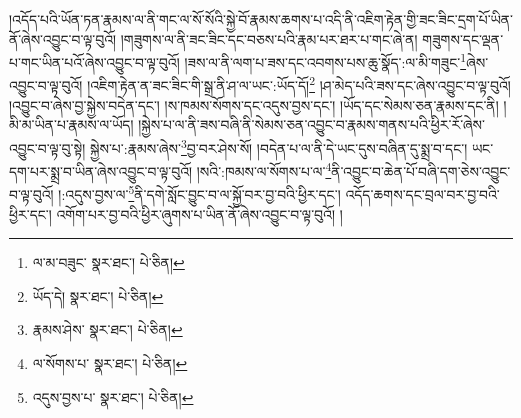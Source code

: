 །འདོད་པའི་ཡོན་ཏན་རྣམས་ལ་ནི་གང་ལ་སོ་སོའི་སྐྱེ་བོ་རྣམས་ཆགས་པ་འདི་ནི་འཇིག་རྟེན་གྱི་ཟང་ཟིང་དྲག་པོ་ཡིན་ནོ་ཞེས་འབྱུང་བ་ལྟ་བུའོ། །གཟུགས་ལ་ནི་ཟང་ཟིང་དང་བཅས་པའི་རྣམ་པར་ཐར་པ་གང་ཞེ་ན། གཟུགས་དང་ལྡན་པ་གང་ཡིན་པའོ་ཞེས་འབྱུང་བ་ལྟ་བུའོ། །ཟས་ལ་ནི་ལག་པ་ཟས་དང་འབགས་པས་ཆུ་སྣོད་:ལ་མི་གཟུང་\footnote{ལ་མ་བཟུང་  སྣར་ཐང་།  པེ་ཅིན། }ཞེས་འབྱུང་བ་ལྟ་བུའོ། །འཇིག་རྟེན་ན་ཟང་ཟིང་གི་སྒྲ་ནི་ཤ་ལ་ཡང་:ཡོད་དོ།\footnote{ཡོད་དེ།  སྣར་ཐང་།  པེ་ཅིན། } །ཤ་མེད་པའི་ཟས་དང་ཞེས་འབྱུང་བ་ལྟ་བུའོ། །འབྱུང་བ་ཞེས་བྱ་སྐྱེས་བདེན་དང་། །ས་ཁམས་སོགས་དང་འདུས་བྱས་དང་། །ཡོད་དང་སེམས་ཅན་རྣམས་དང་ནི། །མི་མ་ཡིན་པ་རྣམས་ལ་ཡོད། །སྐྱེས་པ་ལ་ནི་ཟས་བཞི་ནི་སེམས་ཅན་འབྱུང་བ་རྣམས་གནས་པའི་ཕྱིར་རོ་ཞེས་འབྱུང་བ་ལྟ་བུ་སྟེ། སྐྱེས་པ་:རྣམས་ཞེས་\footnote{རྣམས་ཤེས་  སྣར་ཐང་།  པེ་ཅིན། }བྱ་བར་ཤེས་སོ། །བདེན་པ་ལ་ནི་དེ་ཡང་དུས་བཞིན་དུ་སྨྲ་བ་དང་། ཡང་དག་པར་སྨྲ་བ་ཡིན་ཞེས་འབྱུང་བ་ལྟ་བུའོ། །སའི་:ཁམས་ལ་སོགས་པ་ལ་\footnote{ལ་སོགས་པ་  སྣར་ཐང་།  པེ་ཅིན། }ནི་འབྱུང་བ་ཆེན་པོ་བཞི་དག་ཅེས་འབྱུང་བ་ལྟ་བུའོ། །:འདུས་བྱས་ལ་\footnote{འདུས་བྱས་པ་  སྣར་ཐང་།  པེ་ཅིན། }ནི་དགེ་སློང་བྱུང་བ་ལ་སྐྱོ་བར་བྱ་བའི་ཕྱིར་དང་། འདོད་ཆགས་དང་བྲལ་བར་བྱ་བའི་ཕྱིར་དང་། འགོག་པར་བྱ་བའི་ཕྱིར་ཞུགས་པ་ཡིན་ནོ་ཞེས་འབྱུང་བ་ལྟ་བུའོ། །
